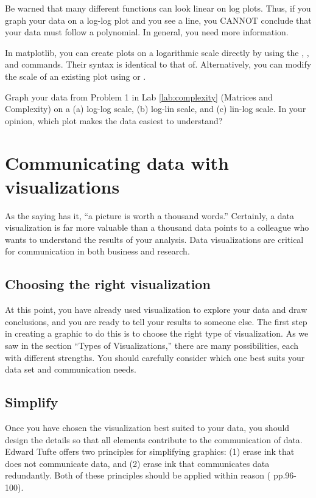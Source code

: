 Be warned that many different functions can look linear on log plots. 
Thus, if you graph your data on a log-log plot and you see a line, you CANNOT conclude that your data must follow a polynomial. 
In general, you need more information.

In matplotlib, you can create plots on a logarithmic scale directly by using the , , and  commands. 
Their syntax is identical to that of. 
Alternatively, you can modify the scale of an existing plot using  or .


\begin{problem}
Graph your data from Problem 1 in Lab \ref{lab:complexity} (Matrices and Complexity) on a (a) log-log scale, (b) log-lin scale, and (c) lin-log scale. 
In your opinion, which plot makes the data easiest to understand?
\end{problem}




\section*{Communicating data with visualizations}

As the saying has it, ``a picture is worth a thousand words.'' 
Certainly, a data visualization is far more valuable than a thousand data points to a colleague who wants to understand the results of your analysis. 
Data visualizations are critical for communication in both business and research.

\subsection*{Choosing the right visualization}
At this point, you have already used visualization to explore your data and draw conclusions, and you are ready to tell your results to someone else. 
The first step in creating a graphic to do this is to choose the right type of visualization. 
As we saw in the section ``Types of Visualizations,'' there are many possibilities, each with different strengths. 
You should carefully consider which one best suits your data set and communication needs.

\subsection*{Simplify}
Once you have chosen the visualization best suited to your data, you should design the details so that all elements contribute to the communication of data. 
Edward Tufte offers two principles for simplifying graphics: (1) erase ink that does not communicate data, and (2) erase ink that communicates data redundantly. 
Both of these principles should be applied within reason (\cite{tufte2001} pp.96-100). 

